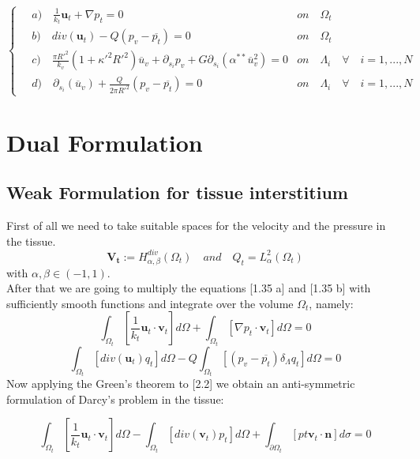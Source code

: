 \documentclass[a4paper]{report}
\begin{document}
\begin{equation}
\begin{cases}
\quad a)\quad \frac{1}{k_t} \mathbf{u}_t+\nabla p_t=0 & on \quad \Omega_t\\
\quad b) \quad div(\mathbf{u}_t)-Q (p_v-\overline{p_t})=0 & on \quad \Omega_t\\
\quad c) \quad \frac{\pi R'^2}{k_v}(1+\kappa'^2 R'^2) \overline{u}_v+ \partial_{s_i} p_v + G \partial_{s_i} (\alpha^{**}\overline{u}_v^2)=0 & on \quad \Lambda_i \quad \forall \quad i=1,...,N\\
\quad d) \quad \partial_{s_i} ( \overline{u}_v) + \frac{Q}{2 \pi R'^2} (p_v - \overline{p_t})=0& on \quad \Lambda_i \quad \forall \quad i=1,...,N
\end{cases}
\end{equation}


\newpage
\chapter{Dual Formulation}
\section{Weak Formulation for tissue interstitium}
First of all we need to take suitable spaces for the velocity and  the pressure in the tissue.
\begin{equation}
\mathbf{V_t}:= H^{div}_{\alpha, \beta}(\Omega_t) \quad and \quad Q_t =L^2_{\alpha}(\Omega_t)
\end{equation}
with $\alpha, \beta \in (-1,1)$.\\
After that we are going to multiply the  equations [1.35 a] and [1.35 b]  with sufficiently smooth functions and integrate over the volume $\Omega_t$, namely:
\begin{equation}
\int_{\Omega_t} [\frac{1}{k_t} \mathbf{u}_t \cdot \mathbf{v}_t] d\Omega+ \int_{\Omega_t} [\nabla p_t \cdot \mathbf{v}_t] d\Omega =0
\end{equation}
\begin{equation}
\int_{\Omega_t} [div(\mathbf{u}_t)q_t ]d\Omega - Q \int_{\Omega_t}[(p_v-\overline{p_t})\delta_{\Lambda}q_t]d\Omega =0
\end{equation}
Now applying the Green's theorem to [2.2]  we obtain an anti-symmetric formulation of Darcy's problem in the tissue:

\begin{equation}
\int_{\Omega_t} [\frac{1}{k_t} \mathbf{u}_t \cdot \mathbf{v}_t] d\Omega- \int_{\Omega_t} [div( \mathbf{v}_t) p_t] d\Omega + \int_{\partial \Omega_t}[pt \mathbf{v}_t \cdot \mathbf{n}]d\sigma =0
\end{equation}
\end{document}
